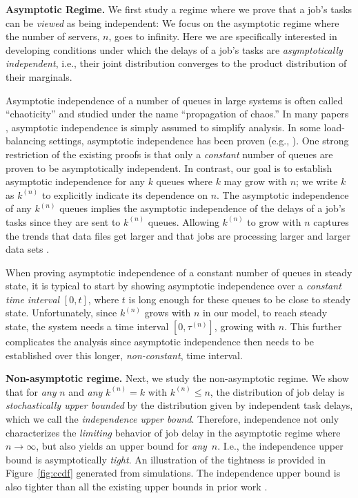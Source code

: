 \documentclass[sigconf]{acmart}
\newcommand{\supn}{^{(n)}}
\begin{document}
\textbf{Asymptotic Regime.}
We first study a regime where we prove that a job's tasks can be \emph{viewed} as being independent:  We focus on the asymptotic regime where the number of servers, $n$, goes to infinity.  Here we are specifically interested in developing conditions under which the delays of a job's tasks are \emph{asymptotically independent}, i.e., their joint distribution converges to the product distribution of their marginals.


Asymptotic independence of a number of queues in large systems is often called ``chaoticity'' and studied under the name ``propagation of chaos.''  In many papers \cite{VulMicGod_12,XieDonLu_15,GarHarSch_16,GarHarSch_17_2}, asymptotic independence is simply assumed to simplify analysis. In some load-balancing settings, asymptotic independence has been proven (e.g., \cite{BraLuPra_12,YinSriKan_15}).  One strong restriction of the existing proofs is that only a \emph{constant} number of queues are proven to be asymptotically independent.  In contrast, our goal is to establish asymptotic independence for any $k$ queues where $k$ may grow with $n$; we write $k$ as $k\supn$ to explicitly indicate its dependence on $n$.  The asymptotic independence of any $k\supn$ queues implies the asymptotic independence of the delays of a job's tasks since they are sent to $k\supn$ queues.  Allowing $k\supn$ to grow with $n$ captures the trends that data files get larger and that jobs are processing larger and larger data sets \cite{CheAlsKat_12}.

When proving asymptotic independence of a constant number of queues in steady state, it is typical to start by showing asymptotic independence over a \emph{constant time interval} $[0,t]$, where $t$ is long enough for these queues to be close to steady state.  Unfortunately, since $k\supn$ grows with $n$ in our model, to reach steady state, the system needs a time interval $[0,\tau\supn]$, growing with $n$.  This further complicates the analysis since asymptotic independence then needs to be established over this longer, \emph{non-constant}, time interval.


\textbf{Non-asymptotic regime.}
Next, we study the non-asymptotic regime.  We show that for \emph{any} $n$ and \emph{any} $k\supn=k$ with $k\supn\le n$, the distribution of job delay is \emph{stochastically upper bounded} by the distribution given by independent task delays, which we call the \emph{independence upper bound}.  Therefore, independence not only characterizes the \emph{limiting} behavior of job delay in the asymptotic regime where $n\to\infty$, but also yields an upper bound for \emph{any}~$n$. I.e., the independence upper bound is asymptotically \emph{tight}. An illustration of the tightness is provided in Figure~\ref{fig:ccdf} generated from simulations.  The independence upper bound is also tighter than all the existing upper bounds in prior work \cite{RizPolCiu_16, LeeShaHua_17}.
\end{document}

